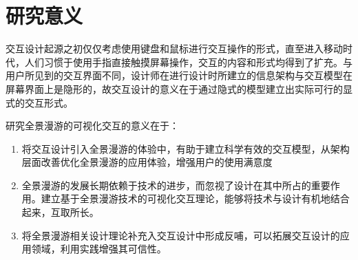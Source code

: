 \section{研究意义}
交互设计起源之初仅仅考虑使用键盘和鼠标进行交互操作的形式，直至进入移动时代，人们习惯于使用手指直接触摸屏幕操作，交互的内容和形式均得到了扩充。与用户所见到的交互界面不同，设计师在进行设计时所建立的信息架构与交互模型在屏幕界面上是隐形的，故交互设计的意义在于通过隐式的模型建立出实际可行的显式的交互形式。

研究全景漫游的可视化交互的意义在于：
\begin{enumerate}
	\item 将交互设计引入全景漫游的体验中，有助于建立科学有效的交互模型，从架构层面改善优化全景漫游的应用体验，增强用户的使用满意度
	\item 全景漫游的发展长期依赖于技术的进步，而忽视了设计在其中所占的重要作用。建立基于全景漫游技术的可视化交互理论，能够将技术与设计有机地结合起来，互取所长。
	\item 将全景漫游相关设计理论补充入交互设计中形成反哺，可以拓展交互设计的应用领域，利用实践增强其可信性。
\end{enumerate}

